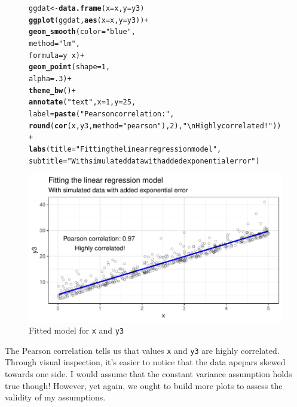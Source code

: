 \documentclass{article}\usepackage[]{graphicx}\usepackage[]{color}
\makeatletter
\def\maxwidth{ %
  \ifdim\Gin@nat@width>\linewidth
    \linewidth
  \else
    \Gin@nat@width
  \fi
}
\newcommand{\hlnum}[1]{\textcolor[rgb]{0.686,0.059,0.569}{#1}}%
\newcommand{\hlstr}[1]{\textcolor[rgb]{0.192,0.494,0.8}{#1}}%
\newcommand{\hlopt}[1]{\textcolor[rgb]{0,0,0}{#1}}%
\newcommand{\hlstd}[1]{\textcolor[rgb]{0.345,0.345,0.345}{#1}}%
\newcommand{\hlkwb}[1]{\textcolor[rgb]{0.69,0.353,0.396}{#1}}%
\newcommand{\hlkwc}[1]{\textcolor[rgb]{0.333,0.667,0.333}{#1}}%
\newcommand{\hlkwd}[1]{\textcolor[rgb]{0.737,0.353,0.396}{\textbf{#1}}}%
\newenvironment{kframe}{%
 \def\at@end@of@kframe{}%
 \ifinner\ifhmode%
  \def\at@end@of@kframe{\end{minipage}}%
  \begin{minipage}{\columnwidth}%
 \fi\fi%
 \def\FrameCommand##1{\hskip\@totalleftmargin \hskip-\fboxsep
 \colorbox{shadecolor}{##1}\hskip-\fboxsep
     \hskip-\linewidth \hskip-\@totalleftmargin \hskip\columnwidth}%
 \MakeFramed {\advance\hsize-\width
   \@totalleftmargin\z@ \linewidth\hsize
   \@setminipage}}%
 {\par\unskip\endMakeFramed%
 \at@end@of@kframe}
\newenvironment{knitrout}{}{} %
\makeatother
\begin{document}
\begin{enumerate}
\begin{enumerate}
\begin{figure}[H]
\begin{center}
\begin{knitrout}
\color{fgcolor}\begin{kframe}
\begin{alltt}
\hlstd{ggdat}\hlkwb{<-}\hlkwd{data.frame}\hlstd{(}\hlkwc{x}\hlstd{=x,} \hlkwc{y}\hlstd{=y3)}
\hlkwd{ggplot}\hlstd{(ggdat,} \hlkwd{aes}\hlstd{(}\hlkwc{x}\hlstd{=x,} \hlkwc{y}\hlstd{=y3))}\hlopt{+}
  \hlkwd{geom_smooth}\hlstd{(}\hlkwc{color}\hlstd{=}\hlstr{"blue"}\hlstd{,}
              \hlkwc{method}\hlstd{=}\hlstr{"lm"}\hlstd{,}
              \hlkwc{formula}\hlstd{=y}\hlopt{~}\hlstd{x)}\hlopt{+}
  \hlkwd{geom_point}\hlstd{(}\hlkwc{shape}\hlstd{=}\hlnum{1}\hlstd{,}
             \hlkwc{alpha}\hlstd{=}\hlnum{.3}\hlstd{)}\hlopt{+}
  \hlkwd{theme_bw}\hlstd{()}\hlopt{+}
  \hlkwd{annotate}\hlstd{(}\hlstr{"text"}\hlstd{,} \hlkwc{x}\hlstd{=}\hlnum{1}\hlstd{,} \hlkwc{y}\hlstd{=}\hlnum{25}\hlstd{,}
           \hlkwc{label}\hlstd{=}\hlkwd{paste}\hlstd{(}\hlstr{"Pearson correlation:"}\hlstd{,}
                       \hlkwd{round}\hlstd{(}\hlkwd{cor}\hlstd{(x,y3,}\hlkwc{method}\hlstd{=}\hlstr{"pearson"}\hlstd{),}\hlnum{2}\hlstd{),}\hlstr{"\textbackslash{}nHighly correlated!"}\hlstd{))}\hlopt{+}
  \hlkwd{labs}\hlstd{(}\hlkwc{title}\hlstd{=}\hlstr{"Fitting the linear regression model"}\hlstd{,}
       \hlkwc{subtitle}\hlstd{=}\hlstr{"With simulated data with added exponential error"}\hlstd{)}
\end{alltt}
\end{kframe}
\includegraphics[width=\maxwidth]{figure/p3plot4-1} 
\end{knitrout}
\caption{Fitted model for \texttt{x} and \texttt{y3}}
\label{p3plot4}
\end{center}
\end{figure}
The Pearson correlation tells us that values \texttt{x} and \texttt{y3} are highly correlated. Through visual inspection, it's easier to notice that the data apepars skewed towards one side. I would assume that the constant variance assumption holds true though! However, yet again, we ought to build more plots to assess the validity of my assumptions.


\end{enumerate}
\end{enumerate}
\end{document}
